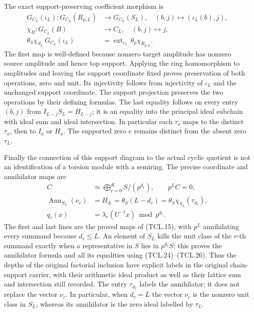 The exact support-preserving coefficient morphism is
\[
 \begin{split}
 G_{C_L}(\iota_L):G_{C_L}(R_{p,L})&\longrightarrow G_{C_L}(S_L),
           \quad (b,j)\longmapsto(\iota_L(b),j),\\
 \chi_B:G_{C_L}(B)&\longrightarrow C_L,
           \quad(b,j)\longmapsto j,\\
 \theta_S\chi_{S_L}\,G_{C_L}(\iota_L)
    &=\operatorname{ext}_{\iota_L}\,\theta_p\chi_{R_{p,L}}.
 \end{split}
 \tag{TCL.26}\label{eq:tcl-support-map}
\]
The first map is well-defined because nonzero target amplitude
has nonzero source amplitude and hence top support. Applying the
ring homomorphism to amplitudes and leaving the support coordinate
fixed proves preservation of both operations, zero and unit.
Its injectivity follows from injectivity of \(\iota_L\) and
the unchanged support coordinate. The support projection preserves
the two operations by their defining formulas. The last equality
follows on every entry \((b,j)\) from
\(I_{L-j}S_L=H_{L-j}\); it is an equality into the principal
ideal subchain with ideal sum and ideal intersection. In particular
each \(\tau_a\) maps to the distinct \(\tau_a\), then to
\(I_a\) or \(H_a\). The supported zero \(e\) remains distinct
from the absent zero \(\tau_L\).

Finally the connection of this support diagram to the actual cyclic
quotient is not an identification of a torsion module with a semiring.
The precise coordinate and annihilator maps are
\[
 \begin{split}
 C&\simeq\bigoplus_{r=0}^K S/(p^{d_r}),\qquad p^L C=0,\\
 \operatorname{Ann}_{S_L}(\nu_r)&=H_{d_r}
     =\theta_S(L-d_r)
     =\theta_S\chi_{S_L}(\tau_{d_r}),\\
 q_r(x)&=\lambda_r(U^{-1}x)\bmod p^{d_r}.
 \end{split}
 \tag{TCL.27}\label{eq:tcl-quotient-support}
\]
The first and last lines are the proved maps of (TCL.15), with
\(p^L\) annihilating every summand because \(d_r\leq L\).
An element of \(S_L\) kills the unit class of the \(r\)-th
summand exactly when a representative in \(S\) lies in
\(p^{d_r}S\); this proves the annihilator formula and all its
equalities using (TCL.24)--(TCL.26). Thus the depths of the
original factorial inclusion have explicit labels in the original
chain-support carrier, with their arithmetic ideal product as well
as their lattice sum and intersection still recorded.
The entry \(\tau_{d_r}\) labels the annihilator; it does not
replace the vector \(\nu_r\). In particular, when \(d_r=L\)
the vector \(\nu_r\) is the nonzero unit class in \(S_L\), whereas
its annihilator is the zero ideal labelled by \(\tau_L\).

